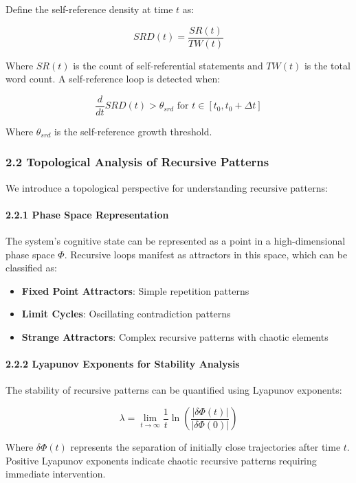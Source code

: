 \documentclass[
]{article}
\providecommand{\tightlist}{%
  \setlength{\itemsep}{0pt}\setlength{\parskip}{0pt}}
\begin{document}
Define the self-reference density at time \(t\) as:

\[SRD(t) = \frac{SR(t)}{TW(t)}\]

Where \(SR(t)\) is the count of self-referential statements and
\(TW(t)\) is the total word count. A self-reference loop is detected
when:

\[\frac{d}{dt}SRD(t) > \theta_{srd} \text{ for } t \in [t_0, t_0+\Delta t]\]

Where \(\theta_{srd}\) is the self-reference growth threshold.

\subsubsection{2.2 Topological Analysis of Recursive
Patterns}\label{topological-analysis-of-recursive-patterns}

We introduce a topological perspective for understanding recursive
patterns:

\paragraph{2.2.1 Phase Space
Representation}\label{phase-space-representation}

The system's cognitive state can be represented as a point in a
high-dimensional phase space \(\Phi\). Recursive loops manifest as
attractors in this space, which can be classified as:

\begin{itemize}
\tightlist
\item
  \textbf{Fixed Point Attractors}: Simple repetition patterns
\item
  \textbf{Limit Cycles}: Oscillating contradiction patterns
\item
  \textbf{Strange Attractors}: Complex recursive patterns with chaotic
  elements
\end{itemize}

\paragraph{2.2.2 Lyapunov Exponents for Stability
Analysis}\label{lyapunov-exponents-for-stability-analysis}

The stability of recursive patterns can be quantified using Lyapunov
exponents:

\[\lambda = \lim_{t \rightarrow \infty} \frac{1}{t} \ln \left( \frac{|\delta \Phi(t)|}{|\delta \Phi(0)|} \right)\]

Where \(\delta \Phi(t)\) represents the separation of initially close
trajectories after time \(t\). Positive Lyapunov exponents indicate
chaotic recursive patterns requiring immediate intervention.
\end{document}
